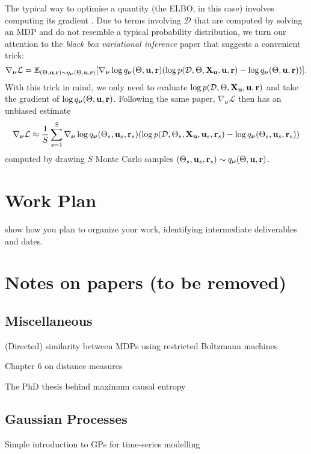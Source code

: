 \documentclass{mprop}
\theoremstyle{definition}
\begin{document}
The typical way to optimise a quantity (the ELBO, in this case) involves
computing its gradient \cite{blei2017variational}. Due to terms involving
$\mathcal{D}$ that are computed by solving an MDP and do not resemble a typical
probability distribution, we turn our attention to the \emph{black box
  variational inference} \cite{DBLP:conf/aistats/RanganathGB14} paper that
suggests a convenient trick:
\[ \nabla_{\bm\nu} \mathcal{L} = \mathbb{E}_{(\Theta, \mathbf{u}, \mathbf{r}) \sim q_{\bm\nu}(\Theta, \mathbf{u}, \mathbf{r})}[\nabla_{\bm\nu} \log q_{\bm\nu}(\Theta, \mathbf{u}, \mathbf{r})
  (\log p(\mathcal{D}, \Theta, \mathbf{X_u}, \mathbf{u}, \mathbf{r}) - \log q_{\bm\nu}(\Theta, \mathbf{u}, \mathbf{r}))]. \]
With this trick in mind, we only need to evaluate $\log p(\mathcal{D}, \Theta, \mathbf{X_u}, \mathbf{u}, \mathbf{r})$ and take the
gradient of $\log q_{\bm\nu}(\Theta, \mathbf{u}, \mathbf{r})$. Following the same paper,
$\nabla_{\bm\nu} \mathcal{L}$ then has an unbiased estimate
\[ \nabla_{\bm\nu} \mathcal{L} \approx \frac{1}{S} \sum_{s=1}^S
  \nabla_{\bm\nu} \log q_{\bm\nu}(\Theta_s, \mathbf{u}_s, \mathbf{r}_s) (\log p(\mathcal{D}, \Theta_s, \mathbf{X_u}, \mathbf{u}_s, \mathbf{r}_s) - \log
  q_{\bm\nu}(\Theta_s, \mathbf{u}_s, \mathbf{r}_s)) \]
computed by drawing $S$ Monte Carlo samples $(\Theta_s, \mathbf{u}_s,
\mathbf{r}_s) \sim q_{\bm\nu}(\Theta, \mathbf{u}, \mathbf{r})$.

\section{Work Plan}

show how you plan to organize your work, identifying intermediate deliverables
and dates.

\section{Notes on papers (to be removed)}

\subsection{Miscellaneous}

(Directed) similarity between MDPs using restricted Boltzmann machines
\cite{9401f4eeb9a64c77afb3d087261d1080}

Chapter 6 on distance measures \cite{mccune2002analysis}

The PhD thesis behind maximum causal entropy \cite{Ziebart:2010:MPA:2049078}

\subsection{Gaussian Processes}

Simple introduction to GPs for time-series modelling \cite{Roberts2013GaussianPF}
\end{document}

